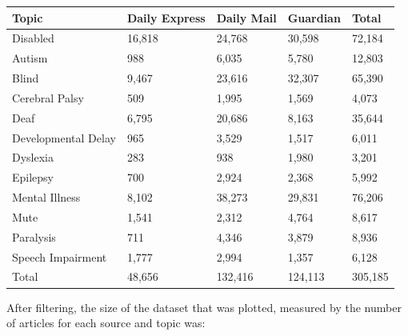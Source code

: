 \documentclass{report}
\begin{document}
\begin{center}
	\begin{tabu} to \textwidth { | X[c] | X[c] | X[c] | X[c] | X[c] | }
		\hline
		Topic & Daily Express & Daily Mail & Guardian & Total \\
		\hline
		Disabled & 16,818 & 24,768 & 30,598 & 72,184  \\
		\hline
		Autism & 988 & 6,035 & 5,780 & 12,803  \\
		\hline
		Blind & 9,467 & 23,616 & 32,307 & 65,390  \\
		\hline
		Cerebral Palsy & 509 & 1,995 & 1,569 & 4,073  \\
		\hline
		Deaf & 6,795 & 20,686 & 8,163 & 35,644  \\
		\hline
		Developmental Delay & 965 & 3,529 & 1,517 & 6,011  \\
		\hline
		Dyslexia & 283 & 938 & 1,980 & 3,201  \\
		\hline
		Epilepsy & 700 & 2,924 & 2,368 & 5,992  \\
		\hline
		Mental Illness & 8,102 & 38,273 & 29,831 & 76,206  \\
		\hline
		Mute & 1,541 & 2,312 & 4,764 & 8,617  \\
		\hline
		Paralysis & 711 & 4,346 & 3,879 & 8,936  \\
		\hline
		Speech Impairment & 1,777 & 2,994 & 1,357 & 6,128  \\
		\hline
		Total & 48,656 & 132,416 & 124,113 & 305,185  \\
		\hline
	\end{tabu}
\end{center}

After filtering, the size of the dataset that was plotted, measured by the number of articles for each source and topic was:
\end{document}

